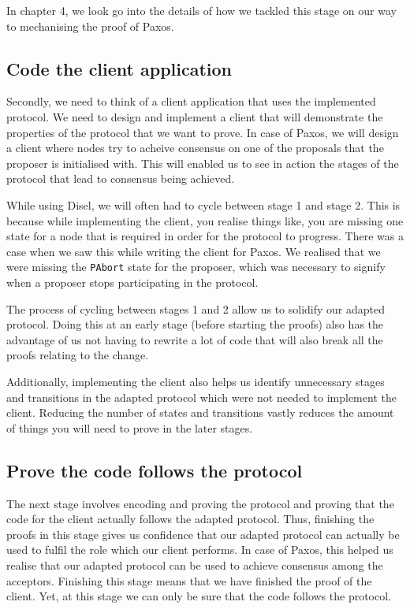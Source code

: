 In chapter 4, we look go into the details of how we tackled this stage on our way
to mechanising the proof of Paxos.

\subsection{Code the client application}
Secondly, we need to think of a client application that uses the implemented protocol.
We need to design and implement a client that will demonstrate the properties of the
protocol that we want to prove. In case of Paxos, we will design a client
where nodes try to acheive consensus on one of the proposals that the proposer
is initialised with. This will enabled us to see in action the stages of the protocol
that lead to consensus being achieved.

While using Disel, we will often had to cycle between stage 1 and stage 2.
This is because while implementing the client, you realise things like, you are
missing one state for a node that is required in order for the protocol to progress.
There was a case when we saw this while writing the client for Paxos.
We realised that we were missing the \texttt{PAbort}
state for the proposer, which was necessary to signify when a proposer stops
participating in the protocol.

The process of cycling between stages 1 and 2 allow us to solidify our adapted
protocol. Doing this at an early stage (before starting the proofs)
also has the advantage of us not having to rewrite a lot of code that will also
break all the proofs relating to the change.

Additionally, implementing the client also helps us identify unnecessary stages
and transitions in the adapted protocol which were not needed to implement the
client. Reducing the number of states and transitions vastly reduces the amount
of things you will need to prove in the later stages.

\subsection{Prove the code follows the protocol}
The next stage involves encoding and proving the protocol
and proving that the code for the client actually follows
the adapted protocol. Thus, finishing the proofs in this stage gives us
confidence that our adapted protocol can actually be used to fulfil the role
which our client performs. In case of Paxos, this helped us realise that our
adapted protocol can be used to achieve consensus among the acceptors.
Finishing this stage means that we have finished the proof of the client.
Yet, at this stage we can only be sure that the code follows the protocol.

